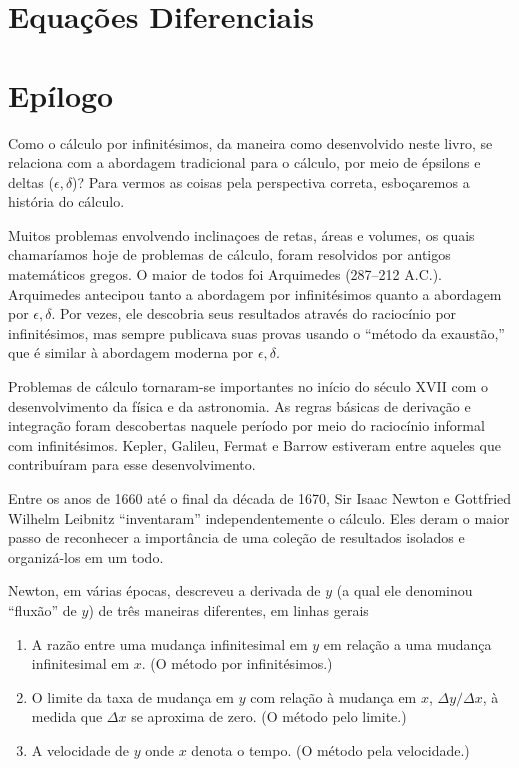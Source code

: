\documentclass{svmono}
\begin{document}
\chapterproblems

\chapter{Equações Diferenciais}
\label{chp:diffeq}

\chapterproblems

\chapter*{Epílogo}

Como o cálculo por infinitésimos, da maneira como desenvolvido neste livro,
se relaciona com a abordagem tradicional para o cálculo, por meio de
épsilons e deltas ($\epsilon,\delta$)?
Para vermos as coisas pela perspectiva correta,
esboçaremos a história do cálculo.

Muitos problemas envolvendo inclinaçoes de retas, áreas e volumes, os quais
chamaríamos hoje de problemas de cálculo, foram resolvidos por antigos
matemáticos gregos. O maior de todos foi Arquimedes (287--212 A.C.).
Arquimedes antecipou tanto a abordagem por infinitésimos quanto a
abordagem por $\epsilon,\delta$. Por vezes, ele descobria seus resultados
através do raciocínio por infinitésimos, mas sempre publicava suas provas
usando o ``método da exaustão,'' que é similar à abordagem moderna por
$\epsilon,\delta$.

Problemas de cálculo tornaram-se importantes no início do século
XVII com o desenvolvimento da física e da astronomia. As regras
básicas de derivação e integração foram descobertas naquele período
por meio do raciocínio informal com infinitésimos. Kepler, Galileu,
Fermat e Barrow estiveram entre aqueles que contribuíram para esse
desenvolvimento.

Entre os anos de 1660 até o final da década de 1670, Sir Isaac Newton e
Gottfried Wilhelm Leibnitz ``inventaram'' independentemente o cálculo.
Eles deram o maior passo de reconhecer a importância de uma coleção
de resultados isolados e organizá-los em um todo.

Newton, em várias épocas, descreveu a derivada de $y$ (a qual ele
denominou ``fluxão'' de $y$) de
três maneiras diferentes, em linhas gerais
\begin{enumerate}[(1)]
\item A razão entre uma mudança infinitesimal em $y$ em relação a
      uma mudança infinitesimal em $x$. (O método por infinitésimos.)
\item O limite da taxa de mudança em $y$ com relação à mudança em $x$,
      $\Delta y / \Delta x$, à medida que $\Delta x$ se aproxima de
      zero. (O método pelo limite.)
\item A velocidade de $y$ onde $x$ denota o tempo. (O método pela
      velocidade.)
\end{enumerate}
\end{document}
